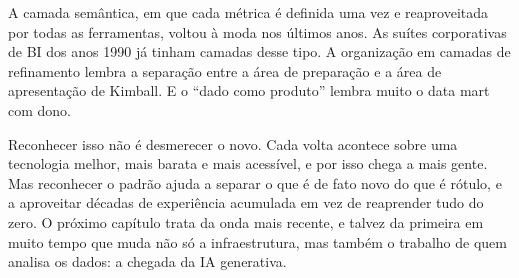A camada semântica, em que cada métrica é definida uma vez e reaproveitada por todas as
ferramentas, voltou à moda nos últimos anos. As suítes corporativas de BI dos anos 1990
já tinham camadas desse tipo. A organização em camadas de refinamento lembra a separação
entre a área de preparação e a área de apresentação de Kimball. E o
\enquote{dado como produto} lembra muito o data mart com dono.

Reconhecer isso não é desmerecer o novo. Cada volta acontece sobre uma tecnologia
melhor, mais barata e mais acessível, e por isso chega a mais gente. Mas reconhecer o
padrão ajuda a separar o que é de fato novo do que é rótulo, e a aproveitar décadas de
experiência acumulada em vez de reaprender tudo do zero. O próximo capítulo trata da
onda mais recente, e talvez da primeira em muito tempo que muda não só a infraestrutura,
mas também o trabalho de quem analisa os dados: a chegada da IA generativa.

\begin{leituras}
\end{leituras}
